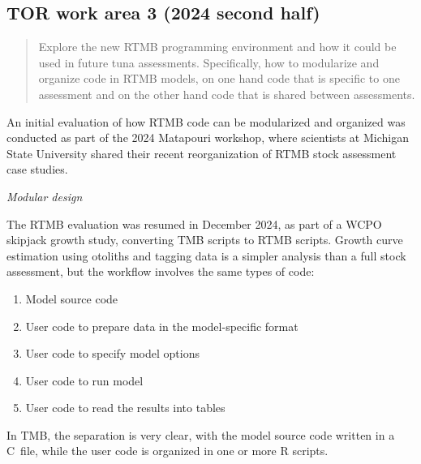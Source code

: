 \documentclass{SCreport}
\newcommand\cpp{\mbox{C\raisebox{0.5ex}{\tiny\bfseries ++}}}
\begin{document}
\vspace{2ex}

\hypertarget{link:tor-3}{}
\subsection{TOR work area 3 (2024 second half)}
\label{sec:tor-3}

\begin{quote}\sf
  Explore the new RTMB programming environment and how it could be used in
  future tuna assessments. Specifically, how to modularize and organize code in
  RTMB models, on one hand code that is specific to one assessment and on the
  other hand code that is shared between assessments.
\end{quote}

\vspace{2ex}

An initial evaluation of how RTMB code can be modularized and organized was
conducted as part of the 2024 Matapouri workshop, where scientists at Michigan
State University shared their recent reorganization of RTMB stock assessment
case studies.

\textit{Modular design}

The RTMB evaluation was resumed in December 2024, as part of a WCPO skipjack
growth study, converting TMB scripts to RTMB scripts. Growth curve estimation
using otoliths and tagging data is a simpler analysis than a full stock
assessment, but the workflow involves the same types of code:

\begin{enumerate}
  \item Model source code\\[-4.5ex]
  \item User code to prepare data in the model-specific format\\[-4.5ex]
  \item User code to specify model options\\[-4.5ex]
  \item User code to run model\\[-4.5ex]
  \item User code to read the results into tables\\[-2.5ex]
\end{enumerate}

In TMB, the separation is very clear, with the model source code written in a
\cpp\ file, while the user code is organized in one or more R scripts.
\end{document}
